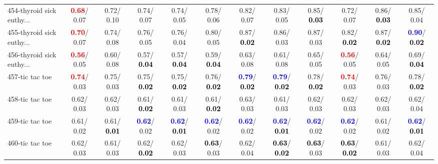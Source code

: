 \begin{table}[h]
\begin{center}
{\begin{tabular}{lc|c|c|c|c|c|c|c|c|c|c}
454-thyroid sick euthy... & \textcolor{red}{\textbf{  0.68}}/  0.07 &   0.72/  0.10 &   0.74/  0.07 &   0.74/  0.05 &   0.78/  0.06 &   0.82/  0.07 &   0.83/  0.05 &   0.85/\textcolor{black}{\textbf{  0.03}} &   0.72/  0.07 &   0.86/\textcolor{black}{\textbf{  0.03}} &   0.85/  0.04 \\
455-thyroid sick euthy... & \textcolor{red}{\textbf{  0.70}}/  0.07 &   0.74/  0.08 &   0.76/  0.05 &   0.76/  0.04 &   0.80/  0.05 &   0.87/\textcolor{black}{\textbf{  0.02}} &   0.86/  0.03 &   0.87/  0.03 &   0.82/\textcolor{black}{\textbf{  0.02}} &   0.87/\textcolor{black}{\textbf{  0.02}} & \textcolor{blue}{\textbf{  0.90}}/\textcolor{black}{\textbf{  0.02}} \\ \hline
456-thyroid sick euthy... & \textcolor{red}{\textbf{  0.56}}/  0.05 &   0.60/  0.08 &   0.57/\textcolor{black}{\textbf{  0.04}} &   0.57/\textcolor{black}{\textbf{  0.04}} &   0.59/\textcolor{black}{\textbf{  0.04}} &   0.63/  0.08 &   0.61/  0.08 &   0.65/  0.05 & \textcolor{red}{\textbf{  0.56}}/  0.05 &   0.64/  0.05 &   0.69/\textcolor{black}{\textbf{  0.04}} \\
457-tic tac toe & \textcolor{red}{\textbf{  0.74}}/  0.03 &   0.75/  0.03 &   0.75/\textcolor{black}{\textbf{  0.02}} &   0.75/\textcolor{black}{\textbf{  0.02}} &   0.76/\textcolor{black}{\textbf{  0.02}} & \textcolor{blue}{\textbf{  0.79}}/\textcolor{black}{\textbf{  0.02}} & \textcolor{blue}{\textbf{  0.79}}/\textcolor{black}{\textbf{  0.02}} &   0.78/\textcolor{black}{\textbf{  0.02}} & \textcolor{red}{\textbf{  0.74}}/  0.03 &   0.76/  0.03 &   0.78/\textcolor{black}{\textbf{  0.02}} \\
458-tic tac toe &   0.62/  0.03 &   0.62/  0.03 &   0.61/\textcolor{black}{\textbf{  0.02}} &   0.61/  0.03 &   0.61/\textcolor{black}{\textbf{  0.02}} &   0.63/  0.03 &   0.61/  0.03 &   0.62/  0.03 &   0.62/  0.03 &   0.62/  0.03 &   0.62/  0.04 \\
459-tic tac toe &   0.61/  0.02 &   0.61/\textcolor{black}{\textbf{  0.01}} & \textcolor{blue}{\textbf{  0.62}}/  0.02 & \textcolor{blue}{\textbf{  0.62}}/\textcolor{black}{\textbf{  0.01}} & \textcolor{blue}{\textbf{  0.62}}/  0.02 & \textcolor{blue}{\textbf{  0.62}}/  0.02 & \textcolor{blue}{\textbf{  0.62}}/\textcolor{black}{\textbf{  0.01}} & \textcolor{blue}{\textbf{  0.62}}/  0.02 & \textcolor{blue}{\textbf{  0.62}}/  0.02 &   0.61/  0.02 & \textcolor{blue}{\textbf{  0.62}}/\textcolor{black}{\textbf{  0.01}} \\
460-tic tac toe &   0.62/  0.03 &   0.61/  0.03 &   0.62/\textcolor{black}{\textbf{  0.02}} &   0.62/  0.03 & \textcolor{black}{\textbf{  0.63}}/  0.03 &   0.62/  0.04 & \textcolor{black}{\textbf{  0.63}}/\textcolor{black}{\textbf{  0.02}} & \textcolor{black}{\textbf{  0.63}}/  0.03 & \textcolor{black}{\textbf{  0.63}}/\textcolor{black}{\textbf{  0.02}} &   0.61/  0.03 &   0.62/  0.04 \\

\end{tabular}}
\end{center}
\end{table}
